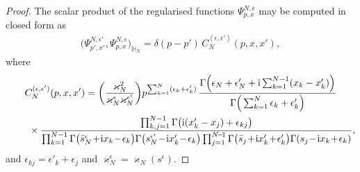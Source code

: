 \documentclass[pdftex]{sigma}%
\numberwithin{equation}{section}
\begin{document}
\begin{proof}
The scalar product of the regularised functions $\Psi^{N,\epsilon}_{p,{x}}$ may be computed in closed form as~\cite{Derkachov:2002tf}
\begin{gather*}
\big(\Psi^{N,\epsilon'}_{p',{x}'},\Psi^{N,\epsilon}_{p,{x}}\big)_{\mathbb H_N}=\delta(p-p') \, C_N^{(\epsilon, \epsilon')}(p, x, x'),
\end{gather*}
where
\begin{gather}
C_N^{( \epsilon, \epsilon')}(p, x, x') =\bigg(\frac{\varkappa_N^2}{\varkappa^{\epsilon}_N\varkappa^{\epsilon'}_N}\bigg)
p^{\sum_{k=1}^N(\epsilon_k+\epsilon'_k)} \,
\frac{\Gamma\Big(\epsilon_N+\epsilon'_N+{\rm i}\sum_{k=1}^{N-1}(x_k-x'_k)\Big)} {\Gamma\Big(\sum_{k=1}^N\epsilon_k+\epsilon'_k\Big)}\nonumber
\\ \qquad\
{}\times \frac{\prod_{k,j=1}^{N-1}\Gamma\big({\rm i}(x'_k-x_j)+\epsilon_{kj}\big)}
{\prod_{k=1}^{N-1}\Gamma\big( \bar s^\epsilon_N\!+\!{\rm i}x_k\!-\!\epsilon_k\big)
\Gamma\big(s_N^{\epsilon'}\!-\!{\rm i}x'_k\!-\!\epsilon_k\big)\prod_{j=1}^{N\!-\!1}
\Gamma\big( \bar s_j\!+\!{\rm i}x'_k\!+\!\epsilon'_k\big)
\Gamma(s_j\!-\!{\rm i}x_k\!+\!\epsilon_k)},\label{CNresult}
\end{gather}
and
$\epsilon_{kj}=\epsilon'_k+\epsilon_j$ and $\varkappa^{\epsilon}_N=\varkappa_N(
s^{\epsilon})$.


\end{proof}
\end{document}
